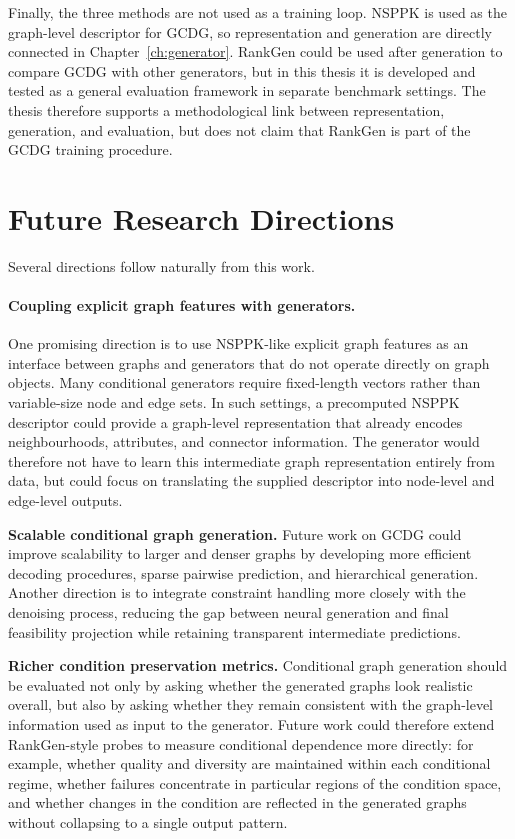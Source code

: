 Finally, the three methods are not used as a training loop. NSPPK is used as
the graph-level descriptor for GCDG, so representation and generation are
directly connected in Chapter~\ref{ch:generator}. RankGen could be used after
generation to compare GCDG with other generators, but in this thesis it is
developed and tested as a general evaluation framework in separate benchmark
settings. The thesis therefore supports a methodological link between
representation, generation, and evaluation, but does not claim that RankGen is
part of the GCDG training procedure.

\section{Future Research Directions}
\label{sec:conclusion:future}

Several directions follow naturally from this work.

\paragraph{Coupling explicit graph features with generators.}
One promising direction is to use NSPPK-like explicit graph features as an
interface between graphs and generators that do not operate directly on graph
objects. Many conditional generators require fixed-length vectors rather than
variable-size node and edge sets. In such settings, a precomputed NSPPK
descriptor could provide a graph-level representation that already encodes
neighbourhoods, attributes, and connector information. The generator would
therefore not have to learn this intermediate graph representation entirely
from data, but could focus on translating the supplied descriptor into
node-level and edge-level outputs.

\textbf{Scalable conditional graph generation.}
Future work on GCDG could improve scalability to larger and denser graphs by
developing more efficient decoding procedures, sparse pairwise prediction, and
hierarchical generation. Another direction is to integrate constraint handling
more closely with the denoising process, reducing the gap between neural
generation and final feasibility projection while retaining transparent
intermediate predictions.

\textbf{Richer condition preservation metrics.}
Conditional graph generation should be evaluated not only by asking whether
the generated graphs look realistic overall, but also by asking whether they
remain consistent with the graph-level information used as input to the
generator. Future work could therefore extend RankGen-style probes to measure
conditional dependence more directly: for example, whether quality and
diversity are maintained within each conditional regime, whether failures
concentrate in particular regions of the condition space, and whether changes
in the condition are reflected in the generated graphs without collapsing to a
single output pattern.

